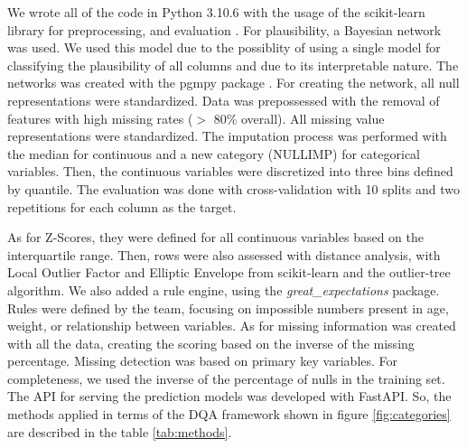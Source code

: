 We wrote all of the code in Python 3.10.6 with the usage of the scikit-learn library for preprocessing, and evaluation \cite{scikit-learn}. 
For plausibility, a Bayesian network was used. We used this model due to the possiblity of using a single model for classifying the plausibility of all columns and due to its interpretable nature.
The networks was created with the pgmpy package \cite{pgmpy}. For creating the network, all null representations were standardized. Data was prepossessed with the removal of features with high missing rates ($>$ 80\% overall). All missing value representations were standardized. The imputation process was performed with the median for continuous and a new category (NULLIMP) for categorical variables. Then, the continuous variables were discretized into three bins defined by quantile. The evaluation was done with cross-validation with 10 splits and two repetitions for each column as the target. 

As for  Z-Scores, they were defined for all continuous variables based on the interquartile range. Then, rows were also assessed with distance analysis, with Local Outlier Factor and Elliptic Envelope from scikit-learn and the outlier-tree algorithm. We also added a rule engine, using the \textit{great\_expectations} package. Rules were defined by the team, focusing on impossible numbers present in age, weight, or relationship between variables. As for missing information was created with all the data, creating the scoring based on the inverse of the missing percentage. Missing detection was based on primary key variables. For completeness, we used the inverse of the percentage of nulls in the training set.
The API for serving the prediction models was developed with FastAPI. So, the methods applied in terms of the DQA framework shown in figure \ref{fig:categories} are described in the table \ref{tab:methods}.

